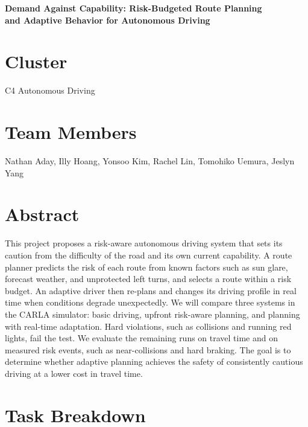 \documentclass[10pt]{article}
\begin{document}
\begin{center}
  {\Large\bfseries Demand Against Capability: Risk-Budgeted Route Planning\\[0.15em]
  and Adaptive Behavior for Autonomous Driving\par}
\end{center}

\section{Cluster}

C4 Autonomous Driving

\section{Team Members}

Nathan Aday, Illy Hoang, Yonsoo Kim, Rachel Lin, Tomohiko Uemura, Jeslyn Yang

\section{Abstract}

This project proposes a risk-aware autonomous driving system that sets its caution from the difficulty of the road and its own current capability. A route planner predicts the risk of each route from known factors such as sun glare, forecast weather, and unprotected left turns, and selects a route within a risk budget. An adaptive driver then re-plans and changes its driving profile in real time when conditions degrade unexpectedly. We will compare three systems in the CARLA simulator: basic driving, upfront risk-aware planning, and planning with real-time adaptation. Hard violations, such as collisions and running red lights, fail the test. We evaluate the remaining runs on travel time and on measured risk events, such as near-collisions and hard braking. The goal is to determine whether adaptive planning achieves the safety of consistently cautious driving at a lower cost in travel time.

\section{Task Breakdown}
\end{document}
